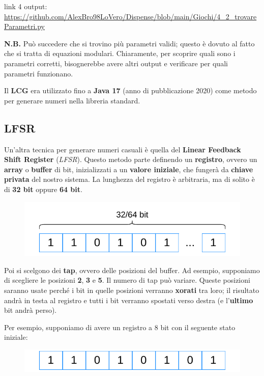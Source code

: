 \documentclass{rapport}
\begin{document}
link 4 output: \textcolor{maincolor}{\url{https://github.com/AlexBro98LoVero/Dispense/blob/main/Giochi/4_2_trovareParametri.py}}
\vspace{0.2cm}

\textbf{N.B.} Può succedere che si trovino più parametri validi; questo è dovuto al fatto che si tratta di equazioni modulari.  
Chiaramente, per scoprire quali sono i parametri corretti, bisognerebbe avere altri output e verificare per quali parametri funzionano.


Il \textbf{LCG} era utilizzato fino a \textbf{Java 17} (anno di pubblicazione 2020) come metodo per generare numeri nella libreria standard.

\newpage

\subsection{LFSR}

Un'altra tecnica per generare numeri casuali è quella del \textbf{Linear Feedback Shift Register} (\textit{LFSR}).  
Questo metodo parte definendo un \textbf{registro}, ovvero un \textbf{array} o \textbf{buffer} di bit, inizializzati a un \textbf{valore iniziale}, che fungerà da \textbf{chiave privata} del nostro sistema.  
La lunghezza del registro è arbitraria, ma di solito è di \textbf{32 bit} oppure \textbf{64 bit}.


\begin{figure}[h]
    \centering
    \includegraphics[width=0.7\linewidth]{logos/4_3cripto.pdf}
\end{figure}

Poi si scelgono dei \textbf{tap}, ovvero delle posizioni del buffer.  
Ad esempio, supponiamo di scegliere le posizioni \textbf{2}, \textbf{3} e \textbf{5}. Il numero di tap può variare.  
Queste posizioni saranno usate perché i bit in quelle posizioni verranno \textbf{xorati} tra loro; il risultato andrà in testa al registro e tutti i bit verranno spostati verso destra (e l'\textbf{ultimo} bit andrà perso).


Per esempio, supponiamo di avere un registro a 8 bit con il seguente stato iniziale:


\begin{figure}[h]
    \centering
    \includegraphics[width=0.7\linewidth]{logos/4_4cripto.pdf}
\end{figure}
\end{document}
